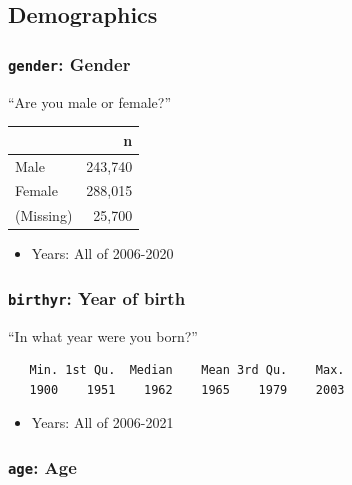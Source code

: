 \documentclass[10pt,article,oneside]{memoir}
\theoremstyle{definition}
\begin{document}
\newpage

\hypertarget{demographics}{%
\subsection{Demographics}\label{demographics}}

\hypertarget{gender-gender}{%
\subsubsection{\texorpdfstring{\texttt{gender}:
Gender}{gender: Gender}}\label{gender-gender}}

``Are you male or female?''

\begin{table}[H]
\centering
\begin{tabular}[t]{lr}
\toprule
 & n\\
\midrule
Male & 243,740\\
Female & 288,015\\
(Missing) & 25,700\\
\bottomrule
\end{tabular}
\end{table}

\begin{itemize}
\tightlist
\item
  Years: All of 2006-2020
\end{itemize}

\hypertarget{birthyr-year-of-birth}{%
\subsubsection{\texorpdfstring{\texttt{birthyr}: Year of
birth}{birthyr: Year of birth}}\label{birthyr-year-of-birth}}

``In what year were you born?''

\begin{verbatim}
   Min. 1st Qu.  Median    Mean 3rd Qu.    Max. 
   1900    1951    1962    1965    1979    2003 
\end{verbatim}

\begin{itemize}
\tightlist
\item
  Years: All of 2006-2021
\end{itemize}

\hypertarget{age-age}{%
\subsubsection{\texorpdfstring{\texttt{age}:
Age}{age: Age}}\label{age-age}}
\end{document}
